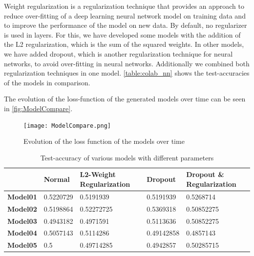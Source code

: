 Weight regularization is a regularization technique that provides an approach to reduce over-fitting of a deep learning neural network model on training data and to improve the performance of the model on new data.\newline
By default, no regularizer is used in layers. For this, we have developed some models with the addition of the L2 regularization, which is the sum of the squared weights.\newline \newline
In other models, we have added dropout, which is another regularization technique for neural networks, to avoid over-fitting in neural networks. Additionally we combined both regularization techniques in one model. \autoref{table:colab_nn} shows the test-accuracies of the models in comparison.

The evolution of the loss-function of the generated models over time can be seen in \autoref{fig:ModelCompare}.

\begin{figure}[H]
\begin{center}
\texttt{[image: ModelCompare.png]}
\end{center}
\caption{Evolution of the loss function of the models over time}
\label{fig:ModelCompare}
\end{figure}

\begin{table}
\centering
\begin{tabular}{|p{2cm}|p{2cm}|p{3cm}|p{2cm}|p{3cm}|}
\hline
 & \textbf{Normal} & \textbf{L2-Weight \newline Regularization} & \textbf{Dropout} & \textbf{Dropout \& \newline Regularization} \\ \hline
\textbf{Model01} & 0.5220729 & 0.5191939 & 0.5191939 & 0.5268714 \\ \hline
\textbf{Model02} & 0.5198864 & 0.52272725 & 0.5369318 & 0.50852275 \\ \hline
\textbf{Model03} & 0.4943182 & 0.4971591 & 0.5113636 & 0.50852275 \\ \hline
\textbf{Model04} & 0.5057143 & 0.5114286 & 0.49142858 & 0.4857143 \\ \hline
\textbf{Model05} & 0.5 & 0.49714285 & 0.4942857 & 0.50285715 \\ \hline

\end{tabular}
\caption{Test-accuracy of various models with different parameters}
\label{table:colab_nn}
\end{table}

